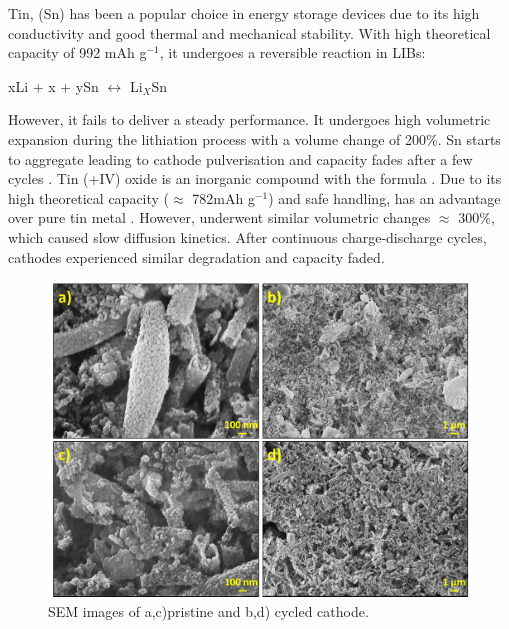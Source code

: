 Tin, (Sn) has been a popular choice in energy storage devices due to its high conductivity and good thermal and mechanical stability. With high theoretical capacity of 992 mAh g$^{-1}$, it undergoes a reversible reaction in LIBs:

\begin{center}
    xLi + x + ySn $\longleftrightarrow$ Li$_X$Sn  \cite{park_effect_2008}
\end{center}

However, it fails to deliver a steady performance. It undergoes high volumetric expansion during the lithiation process with a volume change of 200\%. Sn starts to aggregate leading to cathode pulverisation and capacity fades after a few cycles \cite{park_effect_2008, zhao_tin-based_2016}.  
Tin (+IV) oxide is an inorganic compound with the formula . Due to its high theoretical capacity ($\approx$ 782mAh g$^{-1}$) and safe handling,  has an advantage over pure tin metal \cite{idota_tin-based_1997}. However,  underwent similar volumetric changes $\approx$ 300{\%}, which caused slow diffusion kinetics. After continuous charge-discharge cycles, cathodes experienced similar degradation and capacity faded.

 \begin{figure}[th!]
  \centering
  \includegraphics[width=\textwidth]{Figures/chap6fig/SnO2SEM}
    \caption{SEM images of a,c)pristine and b,d) cycled  cathode.}
  \label{Figures/chap6fig:SnO2SEM}
\end{figure}

